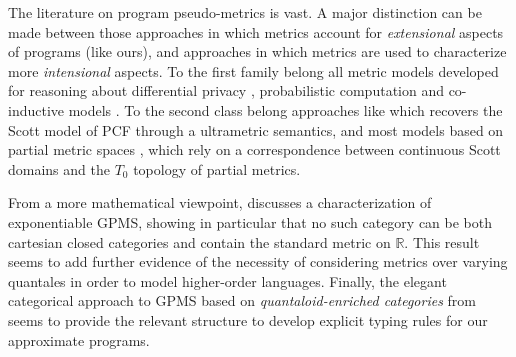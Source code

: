 The literature on program pseudo-metrics is vast. A major distinction can be made between those approaches in which metrics account for \emph{extensional} aspects of programs (like ours), 
 and approaches in which metrics are used to characterize more \emph{intensional} aspects.
To the first family belong all metric models developed for reasoning about differential privacy \cite{10.1145/1932681.1863568, 10.1007/978-3-642-29420-4_3, Barthe_2012},  
probabilistic computation \cite{10.1109/LICS.2015.64, 10.1007/978-3-662-54434-1_13} and co-inductive models \cite{DESHARNAIS2004323, VANBREUGEL2005115, 10.1007/978-3-662-44584-6_4,10.1007/3-540-48224-5_35}.
To the second class belong approaches like \cite{Escardo1999} which recovers the Scott model of PCF through a ultrametric semantics, and most models based on partial metric spaces \cite{Bukatin1997,doi:10.1111/j.1749-6632.1994.tb44144.x}, which rely on a correspondence between continuous Scott domains and the $T_{0}$ topology of partial metrics.

From a more mathematical viewpoint, 
\cite{Stubbe2009} discusses a characterization of exponentiable GPMS, showing in particular that no such category can be both cartesian closed categories and contain the standard metric on $\mathbb R$. This result seems to add further evidence of the necessity of considering metrics over varying quantales in order to model higher-order languages. 
Finally, the elegant categorical approach to GPMS based on \emph{quantaloid-enriched categories} from \cite{Stubbe2018} seems to provide the relevant structure to develop explicit typing rules for our approximate programs.

%

%
%


%






